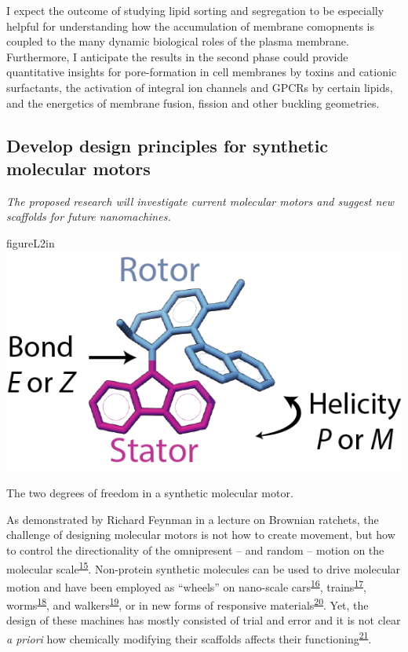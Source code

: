 \documentclass[11pt,notitlepage]{article}
\begin{document}
I expect the outcome of studying lipid sorting and segregation to be
especially helpful for understanding how the accumulation of membrane
comopnents is coupled to the many dynamic biological roles of the plasma
membrane. Furthermore, I anticipate the results in the second phase
could provide quantitative insights for pore-formation in cell membranes
by toxins and cationic surfactants, the activation of integral ion
channels and GPCRs by certain lipids, and the energetics of membrane
fusion, fission and other buckling geometries.

\hypertarget{develop-design-principles-for-synthetic-molecular-motors}{%
\subsection{Develop design principles for synthetic molecular
motors}\label{develop-design-principles-for-synthetic-molecular-motors}}

\emph{The proposed research will investigate current molecular motors
and suggest new scaffolds for future nanomachines.}


\begin{wrapfloat}{figure}{L}{2in}
\centering
\includegraphics{content/images/motor.png}
\caption{The two degrees of freedom in a synthetic molecular motor.}
\label{fig:motor-diagram}
\end{wrapfloat}

As demonstrated by Richard Feynman in a lecture on Brownian ratchets,
the challenge of designing molecular motors is not how to create
movement, but how to control the directionality of the omnipresent --
and random -- motion on the molecular
scale\textsuperscript{\protect\hyperlink{ref-10FsKpWBI}{15}}.
Non-protein synthetic molecules can be used to drive molecular motion
and have been employed as ``wheels'' on nano-scale
cars\textsuperscript{\protect\hyperlink{ref-OAnfwOYX}{16}},
trains\textsuperscript{\protect\hyperlink{ref-10MPrT2Vf}{17}},
worms\textsuperscript{\protect\hyperlink{ref-Tels98bO}{18}}, and
walkers\textsuperscript{\protect\hyperlink{ref-SfUEsk0e}{19}}, or in new
forms of responsive
materials\textsuperscript{\protect\hyperlink{ref-jCuccJLJ}{20}}. Yet,
the design of these machines has mostly consisted of trial and error and
it is not clear \emph{a priori} how chemically modifying their scaffolds
affects their
functioning\textsuperscript{\protect\hyperlink{ref-1H5r7SBir}{21}}.
\end{document}
